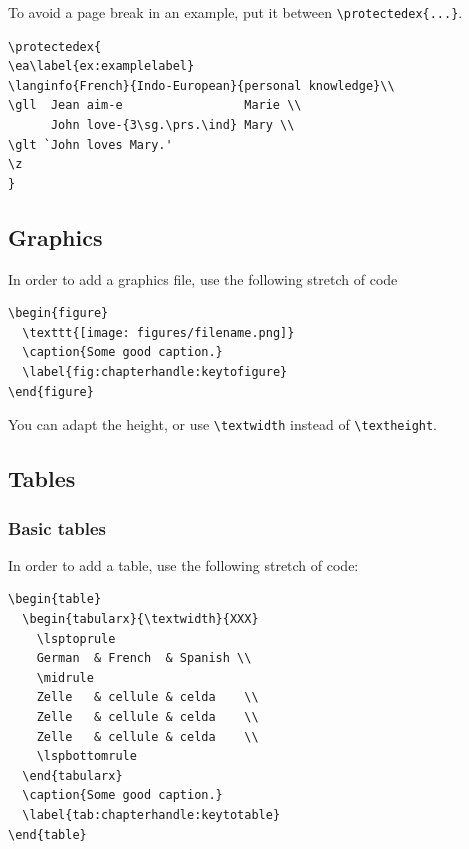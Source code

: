 To avoid a page break in an example, put it between \verb+\protectedex{...}+. 

\begin{verbatim}
\protectedex{
\ea\label{ex:examplelabel}
\langinfo{French}{Indo-European}{personal knowledge}\\
\gll  Jean aim-e                 Marie \\
      John love-{3\sg.\prs.\ind} Mary \\
\glt `John loves Mary.'    
\z
}
\end{verbatim}
 
\subsection{Graphics}
In order to add a graphics file, use the following stretch of code

\begin{verbatim}
\begin{figure}
  \texttt{[image: figures/filename.png]}
  \caption{Some good caption.}
  \label{fig:chapterhandle:keytofigure}
\end{figure}
\end{verbatim}

You can adapt the height, or use \verb+\textwidth+ instead of \verb+\textheight+.

\subsection{Tables}
\subsubsection{Basic tables}
In order to add a table, use the following stretch of code:

\begin{verbatim}
\begin{table} 
  \begin{tabularx}{\textwidth}{XXX}
    \lsptoprule
    German  & French  & Spanish \\
    \midrule
    Zelle   & cellule & celda    \\
    Zelle   & cellule & celda    \\
    Zelle   & cellule & celda    \\
    \lspbottomrule
  \end{tabularx}
  \caption{Some good caption.}
  \label{tab:chapterhandle:keytotable}
\end{table}
\end{verbatim}

